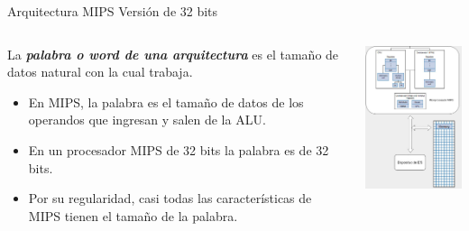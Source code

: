 \documentclass[aspectratio=169,compress]{beamer}
\begin{document}
\begin{frame} {Arquitectura MIPS} {Versión de 32 bits}

    \begin{columns}[onlytextwidth,T]
      \column{\dimexpr\linewidth-50mm-5mm}

	\begin{footnotesize}

\bigskip
La \textbf{\textit{palabra o word de una arquitectura}} es el tamaño de datos natural con la cual trabaja. 

\bigskip
\begin{itemize}
\item En MIPS, la palabra es el tamaño de datos de los operandos que ingresan y salen de la ALU.
\bigskip
\item En un procesador MIPS de 32 bits la palabra es de 32 bits.

\bigskip
\item Por su regularidad, casi todas las características de MIPS tienen el tamaño de la palabra.

\end{itemize}

	\end{footnotesize}

      \column{50mm}
    \includegraphics[width=45mm]{images/mips-arq2.jpg}

    \end{columns}

\end{frame}
\end{document}
